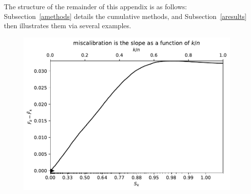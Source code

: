 \documentclass{article}
\begin{document}
The structure of the remainder of this appendix is as follows:
Subsection~\ref{amethods} details the cumulative methods,
and Subsection~\ref{aresults} then illustrates them via several examples.


\begin{figure}
\begin{centering}

\parbox{\imsize}{\includegraphics[width=\imsize]
                {./codes/unweighted/full}}

\vspace{\vertsep}


\end{centering}
\end{figure}
\end{document}
